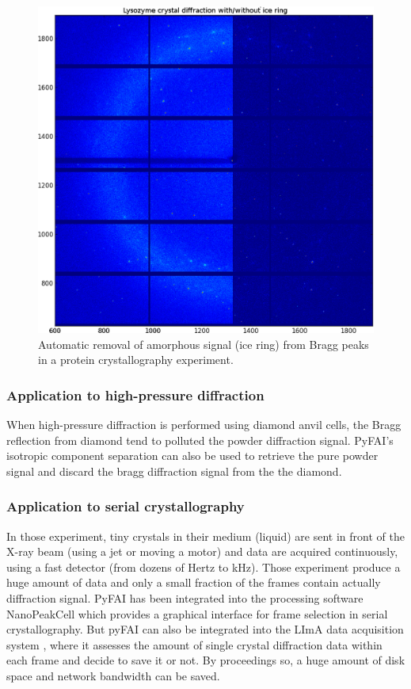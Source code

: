 \documentclass[preprint]{iucr}
\begin{document}
\begin{figure}
\label{separate}
\begin{center}
\includegraphics[width=15cm]{merged.eps}
\caption{Automatic removal of amorphous signal (ice ring) from Bragg peaks in a
protein crystallography experiment.}
\end{center}
\end{figure}

\subsubsection{Application to high-pressure diffraction}
When high-pressure diffraction is performed using diamond anvil cells, the Bragg
reflection from diamond tend to polluted the powder diffraction signal. PyFAI's
isotropic component separation can also be used to retrieve the pure powder
signal and discard the bragg diffraction signal from the the diamond.

\subsubsection{Application to serial crystallography}
In those experiment, tiny crystals in their medium (liquid) are sent in front of
the X-ray beam (using a jet or moving a motor) and data are acquired
continuously, using a fast detector (from dozens of Hertz to kHz).
Those experiment produce a huge amount of data and only a small fraction of the
frames contain actually diffraction signal.
PyFAI has been integrated into the processing software NanoPeakCell which
provides a graphical interface for frame selection in serial crystallography.
But pyFAI can also be integrated into the LImA data acquisition system
\cite{lima}, where it assesses the amount of single crystal
diffraction data within each frame and decide to save it or not.
By proceedings so, a huge amount of disk space and network bandwidth can be
saved.
\end{document}
